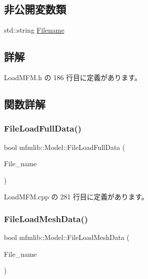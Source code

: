 \subsection*{非公開変数類}
\begin{DoxyCompactItemize}
\item 
std\+::string \mbox{\hyperlink{classmfmlib_1_1_model_a83e1a5e9ec5967b0aae2889672831c21}{Filename}}
\end{DoxyCompactItemize}


\subsection{詳解}


 Load\+M\+F\+M.\+h の 186 行目に定義があります。



\subsection{関数詳解}
\mbox{\label{classmfmlib_1_1_model_a0b260e285347695a8a9f0092b57ddb7f}} 
\subsubsection{\texorpdfstring{File\+Load\+Full\+Data()}{FileLoadFullData()}}
{\footnotesize\ttfamily bool mfmlib\+::\+Model\+::\+File\+Load\+Full\+Data (\begin{DoxyParamCaption}\item[{T\+C\+H\+AR $\ast$}]{File\+\_\+name }\end{DoxyParamCaption})}



 Load\+M\+F\+M.\+cpp の 281 行目に定義があります。

\mbox{\label{classmfmlib_1_1_model_a906eb59ce0373f757c5473512e95c5a4}} 
\subsubsection{\texorpdfstring{File\+Load\+Mesh\+Data()}{FileLoadMeshData()}}
{\footnotesize\ttfamily bool mfmlib\+::\+Model\+::\+File\+Load\+Mesh\+Data (\begin{DoxyParamCaption}\item[{T\+C\+H\+AR $\ast$}]{File\+\_\+name }\end{DoxyParamCaption})}



